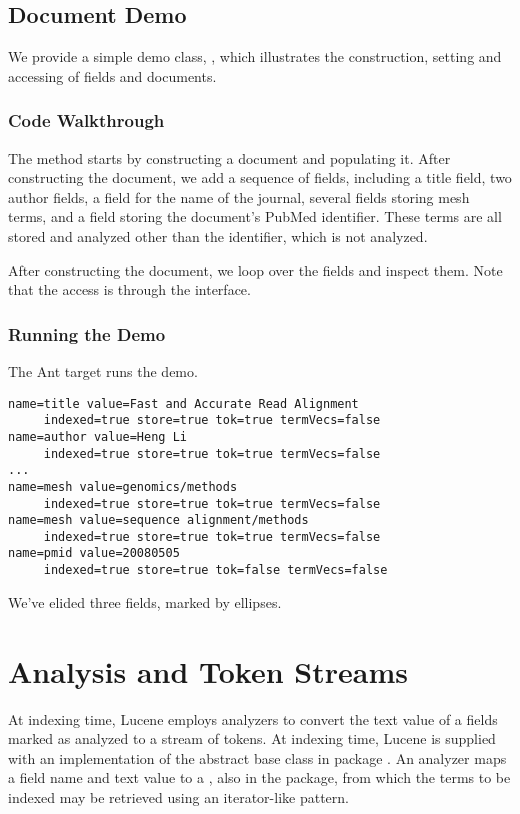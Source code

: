 \subsection{Document Demo}

We provide a simple demo class, , which illustrates
the construction, setting and accessing of fields and documents.

\subsubsection{Code Walkthrough}

The  method starts by constructing a document and
populating it.
%
%
After constructing the document, we add a sequence of fields,
including a title field, two author fields, a field for the name of
the journal, several fields storing mesh terms, and a field storing
the document's PubMed identifier.  These terms are all stored
and analyzed other than the identifier, which is not analyzed.

After constructing the document, we loop over the fields and
inspect them.
%
%
Note that the access is through the  interface.

\subsubsection{Running the Demo}

The Ant target  runs the demo.  
%
\begin{verbatim}
name=title value=Fast and Accurate Read Alignment
     indexed=true store=true tok=true termVecs=false
name=author value=Heng Li
     indexed=true store=true tok=true termVecs=false
...
name=mesh value=genomics/methods
     indexed=true store=true tok=true termVecs=false
name=mesh value=sequence alignment/methods
     indexed=true store=true tok=true termVecs=false
name=pmid value=20080505
     indexed=true store=true tok=false termVecs=false
\end{verbatim}
%
We've elided three fields, marked by ellipses.



\section{Analysis and Token Streams}\label{section:lucene-analysis}

At indexing time, Lucene employs analyzers to convert the text value
of a fields marked as analyzed to a stream of tokens.  At indexing
time, Lucene is supplied with an implementation of the abstract base
class  in package .
An analyzer maps a field name and text value to a ,
also in the  package, from which the terms to be
indexed may be retrieved using an iterator-like pattern.

